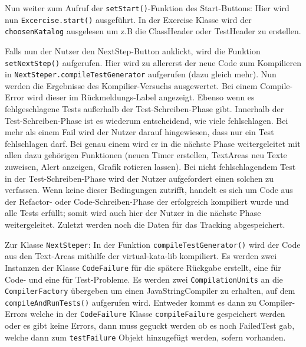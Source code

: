 \documentclass[10pt]{article}
\begin{document}
Nun weiter zum Aufruf der \verb+setStart()+-Funktion des Start-Buttons: Hier wird nun \verb+Excercise.start()+ ausgeführt. In der Exercise Klasse wird der \linebreak \verb+choosenKatalog+ ausgelesen um z.B die ClassHeader oder TestHeader zu erstellen.

Falls nun der Nutzer den NextStep-Button anklickt, wird die Funktion \linebreak \verb+setNextStep()+ aufgerufen.
Hier wird zu allererst der neue Code zum Kompilieren in \verb+NextSteper.compileTestGenerator+ aufgerufen (dazu gleich mehr). Nun werden die Ergebnisse des Kompilier-Versuchs ausgewertet. Bei einem Compile-Error wird dieser im Rückmeldungs-Label angezeigt. Ebenso wenn es fehlgeschlagene Tests außerhalb der Test-Schreiben-Phase gibt. Innerhalb der Test-Schreiben-Phase ist es wiederum entscheidend, wie viele fehlschlagen. Bei mehr als einem Fail wird der Nutzer darauf hingewiesen, dass nur ein Test fehlschlagen darf. Bei genau einem wird er in die nächste Phase weitergeleitet mit allen dazu gehörigen Funktionen (neuen Timer erstellen,  TextAreas neu Texte zuweisen, Alert anzeigen, Grafik rotieren lassen).
Bei nicht fehlschlagendem Test in der Test-Schreiben-Phase wird der Nutzer aufgefordert einen solchen zu verfassen.
Wenn keine dieser Bedingungen zutrifft, handelt es sich um Code aus der Refactor- oder Code-Schreiben-Phase der erfolgreich kompiliert wurde und alle Tests erfüllt; somit wird auch hier der Nutzer in die nächste Phase weitergeleitet.
Zuletzt werden noch die Daten für das Tracking abgespeichert.

Zur Klasse \verb+NextSteper+:
In der Funktion \verb+compileTestGenerator()+ wird der Code aus den Text-Areas mithilfe der virtual-kata-lib kompiliert. Es werden zwei Instanzen der Klasse \verb+CodeFailure+ für die spätere Rückgabe erstellt, eine für Code- und eine für Test-Probleme. Es werden zwei \verb+CompilationUnits+ an die \verb+CompilerFactory+ übergeben um einen JavaStringCompiler zu erhalten, auf dem \verb+compileAndRunTests()+ aufgerufen wird.
Entweder kommt es dann zu Compiler-Errors welche in der \verb+CodeFailure+ Klasse \verb+compileFailure+ gespeichert werden oder es gibt keine Errors, dann muss geguckt werden ob es noch FailedTest gab, welche dann zum \verb+testFailure+ Objekt hinzugefügt werden, sofern vorhanden.
\end{document}

